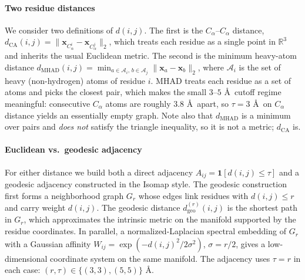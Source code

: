 \documentclass[conference]{IEEEtran}
\begin{document}
\paragraph{Two residue distances} We consider two definitions of $d(i,j)$. The first is the $C_\alpha$--$C_\alpha$ distance, $d_{\mathrm{CA}}(i,j) = \|\mathbf{x}_{C_\alpha^i} - \mathbf{x}_{C_\alpha^j}\|_2$, which treats each residue as a single point in $\mathbb{R}^3$ and inherits the usual Euclidean metric. The second is the minimum heavy-atom distance $d_{\mathrm{MHAD}}(i,j) = \min_{a \in \mathcal{A}_i,\, b \in \mathcal{A}_j} \|\mathbf{x}_a - \mathbf{x}_b\|_2$, where $\mathcal{A}_i$ is the set of heavy (non-hydrogen) atoms of residue $i$. MHAD treats each residue as a set of atoms and picks the closest pair, which makes the small $3$--$5$ \AA\ cutoff regime meaningful: consecutive $C_\alpha$ atoms are roughly $3.8$ \AA\ apart, so $\tau = 3$ \AA\ on $C_\alpha$ distance yields an essentially empty graph. Note also that $d_{\mathrm{MHAD}}$ is a minimum over pairs and \emph{does not} satisfy the triangle inequality, so it is not a metric; $d_{\mathrm{CA}}$ is.

\paragraph{Euclidean vs.\ geodesic adjacency} For either distance we build both a direct adjacency $A_{ij} = \mathbf{1}[d(i,j) \leq \tau]$ and a geodesic adjacency constructed in the Isomap style. The geodesic construction first forms a neighborhood graph $G_r$ whose edges link residues with $d(i,j) \leq r$ and carry weight $d(i,j)$. The geodesic distance $d_{\mathrm{geo}}^{(r)}(i,j)$ is the shortest path in $G_r$, which approximates the intrinsic metric on the manifold supported by the residue coordinates. In parallel, a normalized-Laplacian spectral embedding of $G_r$ with a Gaussian affinity $W_{ij} = \exp(-d(i,j)^2 / 2\sigma^2)$, $\sigma = r/2$, gives a low-dimensional coordinate system on the same manifold. The adjacency uses $\tau = r$ in each case: $(r,\tau) \in \{(3,3), (5,5)\}$ \AA.
\end{document}
